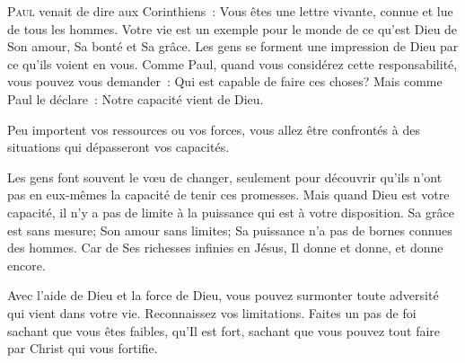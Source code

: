 



\lettrine{P}{aul} venait de dire aux Corinthiens~: 
 \og Vous êtes une lettre vivante, connue et lue de tous les hommes. \fg{}
 Votre vie est un exemple pour le monde de ce qu'est Dieu \ocadr de Son amour,
 Sa bonté et Sa grâce.
 Les gens se forment une impression de Dieu par ce qu'ils voient en vous.
 Comme Paul, quand vous considérez cette responsabilité, 
 vous pouvez vous demander~: 
 \og Qui est capable de faire ces choses? \fg{}
 Mais  comme Paul le déclare~: 
 \og Notre capacité vient de Dieu. \fg{}

Peu importent vos ressources ou vos forces,
 vous allez être confrontés à des situations qui dépasseront vos capacités.


Les gens font souvent le vœu de changer, seulement pour découvrir
 qu'ils n'ont pas en eux-mêmes la capacité de tenir ces promesses.
 Mais quand Dieu est votre capacité, il n'y a pas de limite à la puissance
 qui est à votre disposition.
 Sa grâce est sans mesure; Son amour sans limites;
 Sa puissance n'a pas de bornes connues des hommes.
 Car de Ses richesses infinies en Jésus, Il donne et donne, et donne encore.

Avec l'aide de Dieu et la force de Dieu, vous pouvez surmonter
 toute adversité qui vient dans votre vie. Reconnaissez vos limitations.
 Faites un pas de foi sachant que vous êtes faibles, qu'Il est fort,
 sachant que vous pouvez tout faire par Christ qui vous fortifie.

\dvrule




